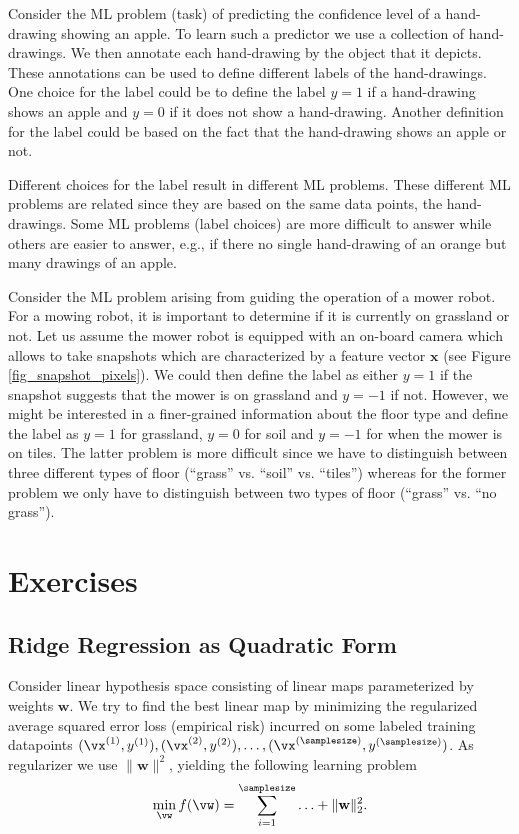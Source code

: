 \documentclass[12pt]{report}
\begin{document}
Consider the ML problem (task) of predicting the confidence level 
of a hand-drawing showing an apple. To learn such a predictor we 
use a collection of hand-drawings. We then annotate each hand-drawing 
by the object that it depicts. These annotations can be used to define 
different labels of the hand-drawings. One choice for the label could 
be to define the label $y=1$ if a hand-drawing shows an apple and 
$y=0$ if it does not show a hand-drawing. Another definition for 
the label could be based on the fact that the hand-drawing shows 
an apple or not. 


Different choices for the label result in different ML problems. These 
different ML problems are related since they are based on the same data 
points, the hand-drawings. Some ML problems (label choices) are more 
difficult to answer while others are easier to answer, e.g., if there no single 
hand-drawing of an orange but many drawings of an apple. 

Consider the ML problem arising from guiding the operation of a mower robot. 
For a mowing robot, it is important to determine if it is currently on grassland 
or not. Let us assume the mower robot is equipped with an on-board camera 
which allows to take snapshots which are characterized by a feature vector 
$\mathbf{x}$ (see Figure \ref{fig_snapshot_pixels}). We could then define the 
label as either $y=1$ if the snapshot suggests that the mower is on grassland 
and $y=-1$ if not. However, we might be interested in a finer-grained information 
about the floor type and define the label as $y=1$ for grassland, 
$y=0$ for soil and $y=-1$ for when the mower is on tiles. The latter problem is 
more difficult since we have to distinguish between three different types of 
floor (``grass'' vs. ``soil'' vs. ``tiles'') whereas for the former problem we only 
have to distinguish between two types of floor (``grass'' vs. ``no grass''). 


\section{Exercises} 
\subsection{Ridge Regression as Quadratic Form} 
\label{ex_2_0}
Consider linear hypothesis space consisting of linear maps parameterized by 
weights $\mathbf{w}$. We try to find the best linear map by minimizing the regularized average 
squared error loss (empirical risk) incurred on some labeled training datapoints 
$(\vx^{(1)},y^{(1)}),(\vx^{(2)},y^{(2)}),\ldots,(\vx^{(\samplesize)},y^{(\samplesize)})$. 
As regularizer we use $\| \mathbf{w} \|^{2}$, yielding the following learning problem 
$$ \min_{\vw} f(\vw) = \sum_{i=1}^{\samplesize}\ldots + \| \mathbf{w} \|^{2}_{2}.$$
\end{document}
